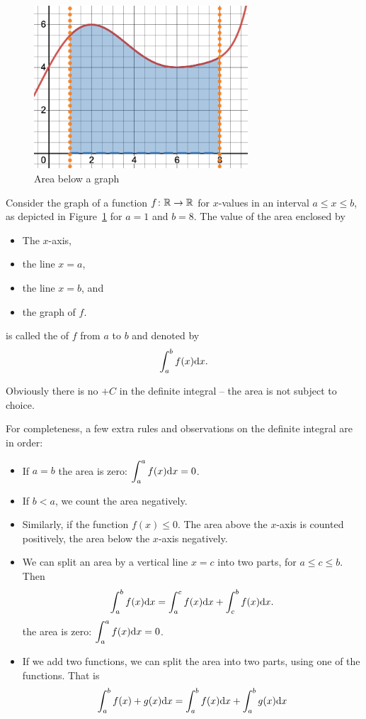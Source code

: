 \begin{figure}
\begin{center}
\includegraphics[width=8cm]{pic/areaunder.png}
\end{center}
\caption{Area below a graph}
\label{figareabelow}
\end{figure}
\begin{defn}
Consider the graph of a function $f\colon{\mathbb R}\to{\mathbb R}$ for $x$-values in an
interval $a\le x\le b$, as depicted in Figure~\ref{figareabelow} for $a=1$ and $b=8$. The value of the area enclosed by
\begin{itemize}
\item The $x$-axis,
\item the line $x=a$,
\item the line $x=b$, and
\item the graph of $f$.
\end{itemize}
is called the  of $f$ from $a$ to $b$ and denoted by
\[
\int_a^b f(x){\mbox{d}}x.
\]
\end{defn}
Obviously there is no $+C$ in the definite integral -- the area is not subject to
choice.
\begin{note}
\label{defintprop}
For completeness, a few extra rules and observations on the definite integral are in order:
\begin{itemize}
\item If $a=b$ the area is zero: $\displaystyle\int_a^a f(x){\mbox{d}}x=0$.
\item If $b<a$, we count the area negatively.
\item Similarly, if the function $f(x)\le 0$. The area above the $x$-axis is counted positively, the area below the $x$-axis negatively.
\item We can split an area by a vertical line $x=c$ into two parts, for $a\le c\le b$. Then
\[
\int_a^b f(x){\mbox{d}}x= \int_a^c f(x){\mbox{d}}x+ \int_c^b f(x){\mbox{d}}x.
\]
the area is zero: $\displaystyle\int_a^a f(x){\mbox{d}}x=0$.
\item
If we add two functions, we can split the area into two parts, using one of the
functions. That is
\[
\int_a^b f(x)+g(x){\mbox{d}}x=\int_a^b f(x){\mbox{d}}x+\int_a^b g(x){\mbox{d}}x
\]
\end{itemize}
\end{note}


